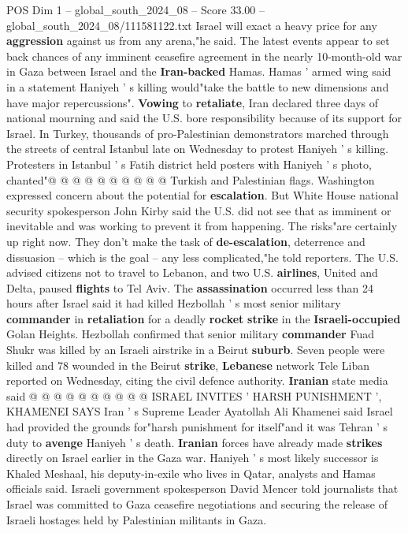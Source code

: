 \begin{textsample}{POS Dim 1 – global\_south\_2024\_08 – Score 33.00 – global\_south\_2024\_08/111581122.txt}
Israel will exact a heavy price for any \textbf{aggression} against us from any arena,"he said.
The latest events appear to set back chances of any imminent ceasefire agreement in the nearly 10-month-old war in Gaza between Israel and the \textbf{Iran-backed} Hamas.
Hamas ' armed wing said in a statement Haniyeh ' s killing would"take the battle to new dimensions and have major repercussions". \textbf{Vowing} to \textbf{retaliate}, Iran declared three days of national mourning and said the U.S. bore responsibility because of its support for Israel.
In Turkey, thousands of pro-Palestinian demonstrators marched through the streets of central Istanbul late on Wednesday to protest Haniyeh ' s killing.
Protesters in Istanbul ' s Fatih district held posters with Haniyeh ' s photo, chanted"@ @ @ @ @ @ @ @ @ @ Turkish and Palestinian flags.
Washington expressed concern about the potential for \textbf{escalation}.
But White House national security spokesperson John Kirby said the U.S. did not see that as imminent or inevitable and was working to prevent it from happening.
The risks"are certainly up right now.
They don't make the task of \textbf{de-escalation}, deterrence and dissuasion -- which is the goal -- any less complicated,"he told reporters.
The U.S. advised citizens not to travel to Lebanon, and two U.S. \textbf{airlines}, United and Delta, paused \textbf{flights} to Tel Aviv.
The \textbf{assassination} occurred less than 24 hours after Israel said it had killed Hezbollah ' s most senior military \textbf{commander} in \textbf{retaliation} for a deadly \textbf{rocket} \textbf{strike} in the \textbf{Israeli-occupied} Golan Heights.
Hezbollah confirmed that senior military \textbf{commander} Fuad Shukr was killed by an Israeli airstrike in a Beirut \textbf{suburb}.
Seven people were killed and 78 wounded in the Beirut \textbf{strike}, \textbf{Lebanese} network Tele Liban reported on Wednesday, citing the civil defence authority. \textbf{Iranian} state media said @ @ @ @ @ @ @ @ @ @ ISRAEL INVITES ' HARSH PUNISHMENT ', KHAMENEI SAYS Iran ' s Supreme Leader Ayatollah Ali Khamenei said Israel had provided the grounds for"harsh punishment for itself"and it was Tehran ' s duty to \textbf{avenge} Haniyeh ' s death. \textbf{Iranian} forces have already made \textbf{strikes} directly on Israel earlier in the Gaza war.
Haniyeh ' s most likely successor is Khaled Meshaal, his deputy-in-exile who lives in Qatar, analysts and Hamas officials said.
Israeli government spokesperson David Mencer told journalists that Israel was committed to Gaza ceasefire negotiations and securing the release of Israeli hostages held by Palestinian militants in Gaza.

\end{textsample}
